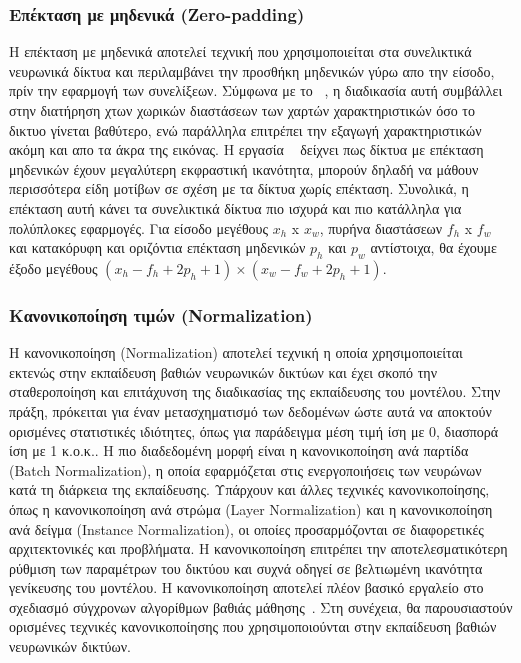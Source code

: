 \documentclass[12pt]{article}
\numberwithin{equation}{section}
\begin{document}
\subsubsection{Επέκταση με μηδενικά (Zero-padding)}

Η επέκταση με μηδενικά αποτελεί τεχνική που χρησιμοποιείται στα συνελικτικά νευρωνικά δίκτυα και περιλαμβάνει την προσθήκη μηδενικών γύρω απο την είσοδο, πρίν την εφαρμογή των συνελίξεων. Σύμφωνα με το ~\cite{han2023deepconvolutionalneuralnetworks}, η διαδικασία αυτή συμβάλλει στην διατήρηση χτων χωρικών διαστάσεων των χαρτών χαρακτηριστικών όσο το δικτυο γίνεται βαθύτερο, ενώ παράλληλα επιτρέπει την εξαγωγή χαρακτηριστικών ακόμη και απο τα άκρα της εικόνας. Η εργασία ~\cite{han2023deepconvolutionalneuralnetworks} δείχνει πως δίκτυα με επέκταση μηδενικών έχουν μεγαλύτερη εκφραστική ικανότητα, μπορούν δηλαδή να μάθουν περισσότερα είδη μοτίβων σε σχέση με τα δίκτυα χωρίς επέκταση. Συνολικά, η επέκταση  αυτή κάνει τα συνελικτικά δίκτυα πιο ισχυρά και πιο κατάλληλα για πολύπλοκες εφαρμογές. Για είσοδο μεγέθους \(x_h\) x \(x_w\), πυρήνα διαστάσεων \(f_h\) x \(f_w\) και κατακόρυφη και οριζόντια επέκταση μηδενικών \(p_h\) και \(p_w\) αντίστοιχα, θα έχουμε έξοδο μεγέθους \((x_h - f_h + 2p_h + 1) \times (x_w - f_w + 2p_h + 1)\). \\

\subsubsection{Κανονικοποίηση τιμών (Normalization)}
 \label{sec:3.4.4}
 
Η κανονικοποίηση (Normalization) αποτελεί τεχνική η οποία χρησιμοποιείται εκτενώς στην εκπαίδευση βαθιών νευρωνικών δικτύων και έχει σκοπό την σταθεροποίηση και επιτάχυνση της διαδικασίας της εκπαίδευσης του μοντέλου. Στην πράξη, πρόκειται για έναν μετασχηματισμό των δεδομένων ώστε αυτά να αποκτούν ορισμένες στατιστικές ιδιότητες, όπως για παράδειγμα μέση τιμή ίση με 0, διασπορά ίση με 1 κ.ο.κ.. Η πιο διαδεδομένη μορφή είναι η κανονικοποίηση ανά παρτίδα (Batch Normalization), η οποία εφαρμόζεται στις ενεργοποιήσεις των νευρώνων κατά τη διάρκεια της εκπαίδευσης. Υπάρχουν και άλλες τεχνικές κανονικοποίησης, όπως η κανονικοποίηση ανά στρώμα (Layer Normalization) και η κανονικοποίηση ανά δείγμα (Instance Normalization), οι οποίες προσαρμόζονται σε διαφορετικές αρχιτεκτονικές και προβλήματα. Η κανονικοποίηση επιτρέπει την αποτελεσματικότερη ρύθμιση των παραμέτρων του δικτύου και συχνά οδηγεί σε βελτιωμένη ικανότητα γενίκευσης του μοντέλου. Η κανονικοποίηση αποτελεί πλέον βασικό εργαλείο στο σχεδιασμό σύγχρονων αλγορίθμων βαθιάς μάθησης~\cite{sun2020newinterpretationsnormalizationmethods}. Στη συνέχεια, θα παρουσιαστούν ορισμένες τεχνικές κανονικοποίησης που χρησιμοποιούνται στην εκπαίδευση βαθιών νευρωνικών δικτύων.
\end{document}
